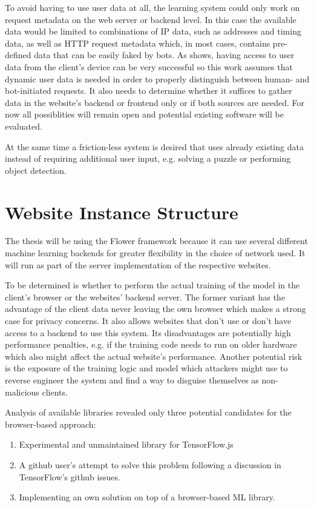 \documentclass[
    fontsize=12pt,
    headings=small,
    parskip=half,           %
    bibliography=totoc,
    numbers=noenddot,       %
    open=any,               %
    final                   %
    ]{scrreprt}
\begin{document}
To avoid having to use user data at all, the learning system could only work on request metadata on the web server or backend level. In this case the available data would be limited to combinations of IP data, such as addresses and timing data, as well as HTTP request metadata which, in most cases, contains pre-defined data that can be easily faked by bots. As \cite{PETS2021} shows, having access to user data from the client's device can be very successful so this work assumes that dynamic user data is needed in order to properly distinguish between human- and bot-initiated requests. It also needs to determine whether it suffices to gather data in the website's backend or frontend only or if both sources are needed. For now all possiblities will remain open and potential existing software will be evaluated.

At the same time a friction-less system is desired that uses already existing data instead of requiring additional user input, e.g. solving a puzzle or performing object detection.

\section{Website Instance Structure}

The thesis will be using the Flower framework because it can use several different machine learning backends for greater flexibility in the choice of network used. It will run as part of the server implementation of the respective websites.

To be determined is whether to perform the actual training of the model in the client's browser or the websites' backend server. The former variant has the advantage of the client data never leaving the own browser which makes a strong case for privacy concerns. It also allows websites that don't use or don't have access to a backend to use this system. Its disadvantages are potentially high performance penalties, e.g. if the training code needs to run on older hardware which also might affect the actual website's performance. Another potential risk is the exposure of the training logic and model which attackers might use to reverse engineer the system and find a way to disguise themselves as non-malicious clients.

Analysis of available libraries revealed only three potential candidates for the browser-based approach:

\begin{enumerate}
	\item Experimental and unmaintained library for TensorFlow.js \cite{PAIRFL2019}
	\item A github user's attempt \cite{SaFL2019} to solve this problem following a discussion in TensorFlow's github issues.
	\item Implementing an own solution on top of a browser-based ML library.
\end{enumerate}
\end{document}
